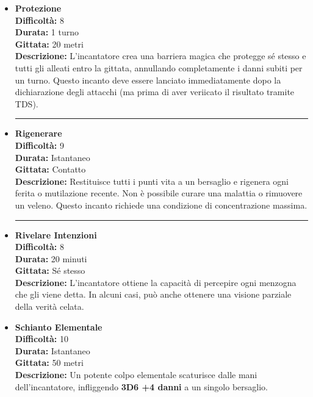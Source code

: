 \documentclass[./magie.tex]{subfiles}
\begin{document}
\begin{itemize}

\item \textbf{Protezione} \\
\textbf{Difficoltà:} 8 \\
\textbf{Durata:} 1 turno \\
\textbf{Gittata:} 20 metri \\
\textbf{Descrizione:} L'incantatore crea una barriera magica che protegge sé stesso e tutti gli alleati entro la gittata, annullando completamente i danni subiti per un turno. Questo incanto deve essere lanciato immediatamente dopo la dichiarazione degli attacchi (ma prima di aver veriicato il risultato tramite TDS).

\vspace{0.2cm}
\noindent
\begin{center}
\rule{\textwidth}{0.4pt} 
\end{center}
\vspace{0.2cm}

\item \textbf{Rigenerare} \\
\textbf{Difficoltà:} 9 \\
\textbf{Durata:} Istantaneo \\
\textbf{Gittata:} Contatto \\
\textbf{Descrizione:} Restituisce tutti i punti vita a un bersaglio e rigenera ogni ferita o mutilazione recente. Non è possibile curare una malattia o rimuovere un veleno. Questo incanto richiede una condizione di concentrazione massima.

\vspace{0.2cm}
\noindent
\begin{center}
\rule{\textwidth}{0.4pt} 
\end{center}
\vspace{0.2cm}

\item \textbf{Rivelare Intenzioni} \\
\textbf{Difficoltà:} 8 \\
\textbf{Durata:} 20 minuti \\
\textbf{Gittata:} Sé stesso \\
\textbf{Descrizione:} L'incantatore ottiene la capacità di percepire ogni menzogna che gli viene detta. In alcuni casi, può anche ottenere una visione parziale della verità celata.

\item \textbf{Schianto Elementale} \\
\textbf{Difficoltà:} 10 \\
\textbf{Durata:} Istantaneo \\
\textbf{Gittata:} 50 metri \\
\textbf{Descrizione:} Un potente colpo elementale scaturisce dalle mani dell'incantatore, infliggendo \textbf{3D6 +4 danni} a un singolo bersaglio.


\end{itemize}
\end{document}
